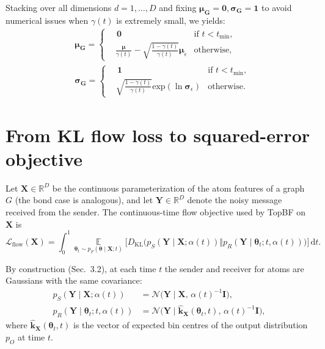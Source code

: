 Stacking over all dimensions $d=1,\dots,D$ and fixing $\boldsymbol{\mu}_\mathbf{G} = \mathbf{0}, \boldsymbol{\sigma}_\mathbf{G} = \mathbf{1}$ to avoid numerical issues when $\gamma(t)$ is extremely small, we yields:
\begin{equation}
    \begin{aligned}
        & \boldsymbol{\mu}_\mathbf{G} = \left\{
    \begin{aligned}
        & \, \boldsymbol{0} & \text{if $t<t_{\text{min}}$},\\
        & \frac{\boldsymbol{\mu}}{\gamma(t)} - \sqrt{\frac{1-\gamma(t)}{\gamma(t)}}\boldsymbol{\mu}_\epsilon & \text{otherwise,}
    \end{aligned}
    \right. \\
    & \boldsymbol{\sigma}_\mathbf{G} = \left\{
    \begin{aligned}
        & \, \boldsymbol{1} & \text{if $t<t_{\text{min}}$},\\
        & \sqrt{\frac{1-\gamma(t)}{\gamma(t)}}\text{exp}(\ln\boldsymbol{\sigma}_\epsilon) & \text{otherwise.}
    \end{aligned}
    \right.
    \end{aligned}
\end{equation}



\section{From KL flow loss to squared-error objective}
\label{app:loss}

Let $\mathbf{X}\in\mathbb{R}^{D}$ be the continuous parameterization of the atom features of a graph $G$
(the bond case is analogous), and let $\mathbf{Y}\in\mathbb{R}^{D}$ denote the noisy message received
from the sender. The continuous-time flow objective used by TopBF on $\mathbf{X}$ is
\begin{equation}
\mathcal{L}_{\text{flow}}(\mathbf{X})
=
\int_0^1 
\mathop{\mathbb{E}}\limits_{\boldsymbol{\theta}_t \sim p_F(\boldsymbol{\theta}\mid \mathbf{X};t)} \Big[ D_{\mathrm{KL}}\big( p_S(\mathbf{Y} \mid \mathbf{X};\alpha(t))
\Vert
p_R(\mathbf{Y} \mid \boldsymbol{\theta}_t; t,\alpha(t)) \big) \Big] \,\mathrm{d}t.
\label{eq:cts-flow-kl}
\end{equation}

By construction (Sec.~3.2), at each time $t$ the sender and receiver for atoms are Gaussians with the
same covariance:
\begin{align}
p_S(\mathbf{Y} \mid \mathbf{X};\alpha(t))
&=
\mathcal{N}\big(\mathbf{Y} \mid \mathbf{X},\,\alpha(t)^{-1}\mathbf{I}\big), \\
p_R(\mathbf{Y} \mid \boldsymbol{\theta}_t; t,\alpha(t))
&=
\mathcal{N}\big(\mathbf{Y} \mid \hat{\mathbf{k}}_{\mathbf{X}}(\boldsymbol{\theta}_t,t),\,\alpha(t)^{-1}\mathbf{I}\big),
\end{align}
where $\hat{\mathbf{k}}_{\mathbf{X}}(\boldsymbol{\theta}_t,t)$ is the vector of expected bin centres of
the output distribution $p_O$ at time $t$.

